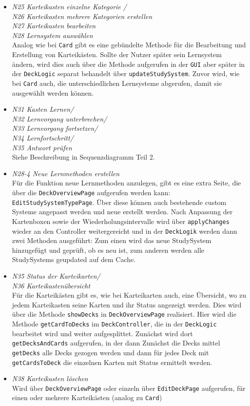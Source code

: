 \documentclass[fontsize=12pt,paper=A4,twoside]{scrartcl}
\begin{document}
    \begin{itemize}
    \item\textit{N25 Karteikasten einzelne Kategorie / \\
    N26 Karteikasten mehrere Kategorien erstellen\\
    N27 Karteikasten bearbeiten\\
    N28 Lernsystem auswählen}\\
    Analog wie bei \texttt{Card} gibt es eine gebündelte Methode für die Bearbeitung und Erstellung von Karteikästen.
    Sollte der Nutzer später sein Lernsystem ändern, wird dies auch über die Methode aufgerufen in der \texttt{GUI} aber später in der \texttt{DeckLogic}
    separat behandelt über \texttt{updateStudySystem}.
    Zuvor wird, wie bei \texttt{Card} auch, die unterschiedlichen Lernsysteme abgerufen, damit sie ausgewählt werden können.
    \item \textit{N31 Kasten Lernen/ \\
    N32 Lernvorgang unterbrechen/ \\
    N33 Lernvorgang fortsetzen/ \\
    N34 Lernfortschritt/ \\
    N35 Antwort prüfen} \\ Siehe Beschreibung in Sequenzdiagramm Teil 2.
    \item \textit{N28-4 Neue Lernmethoden erstellen}\\
    Für die Funktion neue Lernmethoden anzulegen, gibt es eine extra Seite, die über die \texttt{DeckOverviewPage} aufgerufen werden kann: \texttt{EditStudySystemTypePage}.
    Über diese können auch bestehende custom Systeme angepasst werden und neue erstellt werden. Nach Anpassung der Kartenboxen sowie der Wiederholungsintervalle wird über \texttt{applyChanges} 
    wieder an den Controller weitergereicht und in der \texttt{DeckLogik} werden dann zwei Methoden ausgeführt: Zum einen wird das neue StudySystem hinzugefügt und geprüft, ob es neu ist, zum anderen
    werden alle StudySystems geupdated auf dem Cache.
    \item \textit{N35 Status der Karteikarten/ \\ N36 Karteikastenübersicht}\\ 
    Für die Karteikästen gibt es, wie bei Karteikarten auch, eine Übersicht, wo zu jedem Karteikasten seine Karten und ihr Status angezeigt werden.
    Dies wird über die Methode \texttt{showDecks} in \texttt{DeckOverviewPage} realisiert. Hier wird die Methode \texttt{getCardToDecks} im \texttt{DeckController}, 
    die in der \texttt{DeckLogic} bearbeitet wird und weiter aufgesplittet. Zunächst wird dort \texttt{getDecksAndCards} aufgerufen, in der dann Zunächst
    die Decks mittel \texttt{getDecks} alle Decks gezogen werden und dann für jedes Deck mit \texttt{getCardsToDeck} die einzelnen Karten mit Status
    ermittelt werden.
    \item\textit{ N38 Karteikasten löschen}\\ Wird über \texttt{DeckOverviewPage} oder einzeln über \texttt{EditDeckPage} aufgerufen, für einen oder mehrere Karteikästen (analog zu \texttt{Card})
    \end{itemize}
\end{document}
